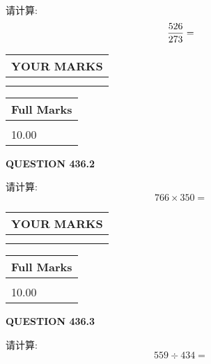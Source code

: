 \documentclass{ctexart}
\begin{document}
  
 
请计算:
\begin{equation}
\frac { %
526 }  {  %
273} = \nonumber
\end{equation}
 

 

 
  
\vspace{0.2in}
  
\noindent\begin{tabular}{|l|}
\hline
 YOUR MARKS  \\
\hline
 \\ 
 \\ 
\hline
\end{tabular}
\hspace{0.05in} \begin{tabular}{|l|}
\hline
 Full Marks  \\
\hline
 \\ 
10.00 \\
\hline
\end{tabular}
{\textbf{\Large{QUESTION
436.2 
}}}
  
  
 
请计算:
\begin{equation}
766  \times    %
350 = \nonumber
\end{equation}
 

 

 
  
\vspace{0.2in}
  
\noindent\begin{tabular}{|l|}
\hline
 YOUR MARKS  \\
\hline
 \\ 
 \\ 
\hline
\end{tabular}
\hspace{0.05in} \begin{tabular}{|l|}
\hline
 Full Marks  \\
\hline
 \\ 
10.00 \\
\hline
\end{tabular}
{\textbf{\Large{QUESTION
436.3 
}}}
  
  
 
请计算:
\begin{equation}
559  \div    %
434 = \nonumber
\end{equation}
 

 
\end{document}
